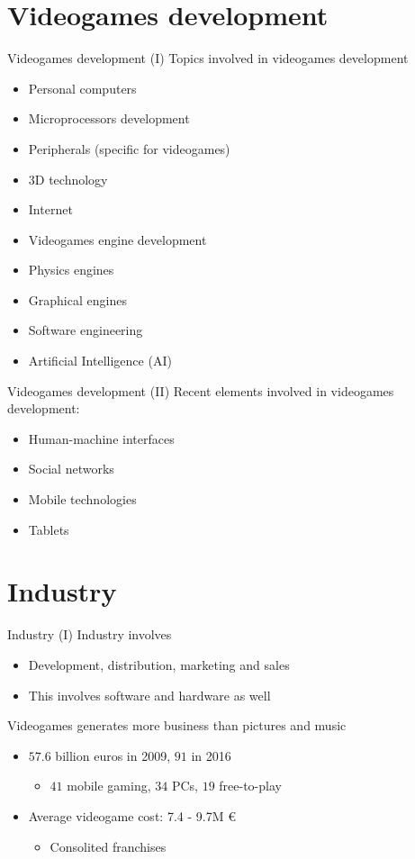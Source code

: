 \documentclass[10pt,compress]{beamer} %
\begin{document}
\section{Videogames development}
\begin{frame}{Videogames development (I)}
	Topics involved in videogames development
	\begin{itemize}
		\item Personal computers
		\item Microprocessors development
		\item Peripherals (specific for videogames)
		\item 3D technology
		\item Internet
		\item Videogames engine development
		\item Physics engines
		\item Graphical engines
		\item Software engineering
		\item Artificial Intelligence (AI)
	\end{itemize}
\end{frame}

\begin{frame}{Videogames development (II)}
	Recent elements involved in videogames development:
	\begin{itemize}
		\item Human-machine interfaces
		\item Social networks
		\item Mobile technologies
		\item Tablets
	\end{itemize}
\end{frame}

\section[Industry]{Industry}
\begin{frame}{Industry (I)}
	Industry involves
	\begin{itemize}
		\item Development, distribution, marketing and sales
		\item This involves software and hardware as well
	\end{itemize}
	Videogames generates more business than pictures and music
	\begin{itemize}
		\item $57.6$ billion euros in 2009, $91$ in 2016
		\begin{itemize}
		\item $41$ mobile gaming, $34$ PCs, $19$ free-to-play
		\end{itemize}
		\item Average videogame cost: 7.4 - 9.7M \euro
			\begin{itemize}
			\item Consolited franchises
			\end{itemize}
	\end{itemize}
\end{frame}
\end{document}
